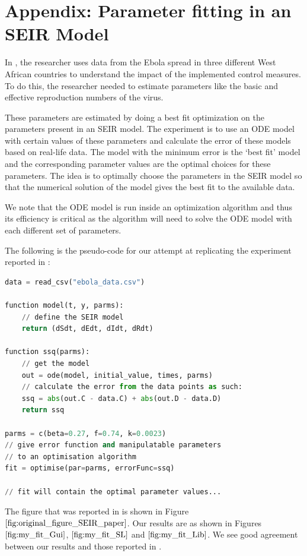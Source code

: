 \section{Appendix: Parameter fitting in an SEIR Model}
\label{section:ebola_paper}
In \cite{althaus2014estimating}, the researcher uses data from the Ebola spread in three different West African countries to understand the impact of the implemented control measures. To do this, the researcher needed to estimate parameters like the basic and effective reproduction numbers of the virus.

These parameters are estimated by doing a best fit optimization on the parameters present in an SEIR model. The experiment is to use an ODE model with certain values of these parameters and calculate the error of these models based on real-life data. The model with the minimum error is the `best fit' model and the corresponding parameter values are the optimal choices for these parameters. The idea is to optimally choose the parameters in the SEIR model so that the numerical solution of the model gives the best fit to the available data.

We note that the ODE model is run inside an optimization algorithm and thus its efficiency is critical as the algorithm will need to solve the ODE model with each different set of parameters.

The following is the pseudo-code for our attempt at replicating the experiment reported in \cite{althaus2014estimating}:

\begin{minipage}{\linewidth}
\begin{lstlisting}[language=Python]
data = read_csv("ebola_data.csv")

function model(t, y, parms):
    // define the SEIR model
    return (dSdt, dEdt, dIdt, dRdt)

function ssq(parms):
    // get the model
    out = ode(model, initial_value, times, parms)
    // calculate the error from the data points as such:
    ssq = abs(out.C - data.C) + abs(out.D - data.D)
    return ssq

parms = c(beta=0.27, f=0.74, k=0.0023)
// give error function and manipulatable parameters
// to an optimisation algorithm
fit = optimise(par=parms, errorFunc=ssq)

// fit will contain the optimal parameter values...
\end{lstlisting}
\end{minipage}

The figure that was reported in  \cite{althaus2014estimating} is shown in Figure $\ref{fig:original_figure_SEIR_paper}$. Our results are as shown in Figures $\ref{fig:my_fit_Gui}$, $\ref{fig:my_fit_SL}$ and $\ref{fig:my_fit_Lib}$. We see good agreement between our results and those reported in  \cite{althaus2014estimating}.

